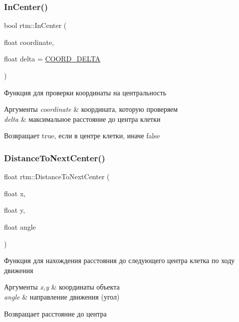 \subsubsection{\texorpdfstring{In\+Center()}{InCenter()}}
{\footnotesize\ttfamily bool rtm\+::\+In\+Center (\begin{DoxyParamCaption}\item[{float}]{coordinate,  }\item[{float}]{delta = {\ttfamily \hyperlink{namespacertm_a9ae158a8873bdf59aa9872cdada6c657}{C\+O\+O\+R\+D\+\_\+\+D\+E\+L\+TA}} }\end{DoxyParamCaption})}



Функция для проверки координаты на центральность 


\begin{DoxyParams}{Аргументы}
{\em coordinate} & координата, которую проверяем \\
\hline
{\em delta} & максимальное расстояние до центра клетки \\
\hline
\end{DoxyParams}
\begin{DoxyReturn}{Возвращает}
true, если в центре клетки, иначе false 
\end{DoxyReturn}
\mbox{\label{namespacertm_aa546266dce0a8d2a50a7fe311e514668}} 
\subsubsection{\texorpdfstring{Distance\+To\+Next\+Center()}{DistanceToNextCenter()}}
{\footnotesize\ttfamily float rtm\+::\+Distance\+To\+Next\+Center (\begin{DoxyParamCaption}\item[{float}]{x,  }\item[{float}]{y,  }\item[{float}]{angle }\end{DoxyParamCaption})}



Функция для нахождения расстояния до следующего центра клетка по ходу движения 


\begin{DoxyParams}{Аргументы}
{\em x,y} & координаты объекта \\
\hline
{\em angle} & направление движения (угол) \\
\hline
\end{DoxyParams}
\begin{DoxyReturn}{Возвращает}
расстояние до центра 
\end{DoxyReturn}
\mbox{\label{namespacertm_a69199b6d204d2ebf33b76e5a7ad52876}} 
